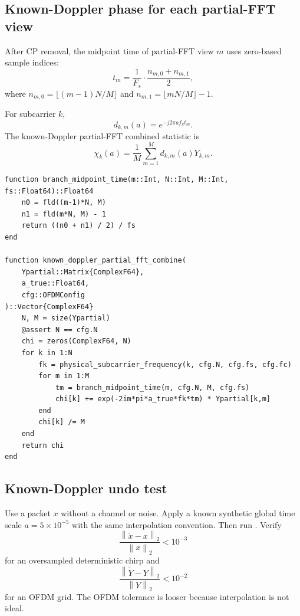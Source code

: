 \documentclass[11pt]{article}
\newcommand{\norm}[1]{\left\lVert #1 \right\rVert}
\newcommand{\code}[1]{\texttt{\detokenize{#1}}}
\begin{document}
\subsection{Known-Doppler phase for each partial-FFT view}

After CP removal, the midpoint time of partial-FFT view $m$ uses zero-based sample indices:
\begin{equation}
t_m=\frac{1}{F_s}\cdot \frac{n_{m,0}+n_{m,1}}{2},
\end{equation}
where $n_{m,0}=\lfloor(m-1)N/M\rfloor$ and $n_{m,1}=\lfloor mN/M\rfloor-1$.

For subcarrier $k$,
\begin{equation}
d_{k,m}(a)=e^{-j2\pi a f_k t_m}.
\end{equation}
The known-Doppler partial-FFT combined statistic is
\begin{equation}
\chi_k(a)=\frac{1}{M}\sum_{m=1}^M d_{k,m}(a)Y_{k,m}.
\end{equation}

\begin{lstlisting}
function branch_midpoint_time(m::Int, N::Int, M::Int, fs::Float64)::Float64
    n0 = fld((m-1)*N, M)
    n1 = fld(m*N, M) - 1
    return ((n0 + n1) / 2) / fs
end

function known_doppler_partial_fft_combine(
    Ypartial::Matrix{ComplexF64},
    a_true::Float64,
    cfg::OFDMConfig
)::Vector{ComplexF64}
    N, M = size(Ypartial)
    @assert N == cfg.N
    chi = zeros(ComplexF64, N)
    for k in 1:N
        fk = physical_subcarrier_frequency(k, cfg.N, cfg.fs, cfg.fc)
        for m in 1:M
            tm = branch_midpoint_time(m, cfg.N, M, cfg.fs)
            chi[k] += exp(-2im*pi*a_true*fk*tm) * Ypartial[k,m]
        end
        chi[k] /= M
    end
    return chi
end
\end{lstlisting}

\subsection{Known-Doppler undo test}

Use a packet $x$ without a channel or noise. Apply a known synthetic global time scale $a=5\times10^{-5}$ with the same interpolation convention. Then run \code{compensate_known_doppler}. Verify
\begin{equation}
\frac{\norm{\tilde x-x}_2}{\norm{x}_2}<10^{-3}
\end{equation}
for an oversampled deterministic chirp and
\begin{equation}
\frac{\norm{\tilde Y-Y}_2}{\norm{Y}_2}<10^{-2}
\end{equation}
for an OFDM grid. The OFDM tolerance is looser because interpolation is not ideal.
\end{document}
